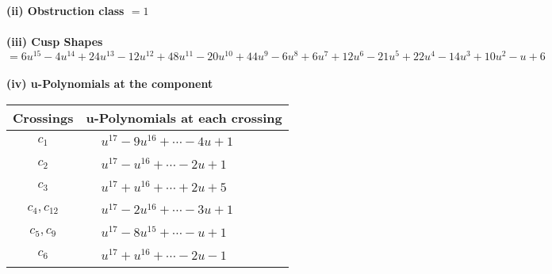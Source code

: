 \documentclass[1p]{elsarticle_modified}
\theoremstyle{definition}
\begin{document}
\flushleft \textbf{(ii) Obstruction class $= 1$}\\~\\
\flushleft \textbf{(iii) Cusp Shapes $= 6 u^{15}-4 u^{14}+24 u^{13}-12 u^{12}+48 u^{11}-20 u^{10}+44 u^9-6 u^8+6 u^7+12 u^6-21 u^5+22 u^4-14 u^3+10 u^2- u+6$}\\~\\
\newpage\renewcommand{\arraystretch}{1}
\flushleft \textbf{(iv) u-Polynomials at the component}\newline \\
\begin{tabular}{m{50pt}|m{274pt}}
Crossings & \hspace{64pt}u-Polynomials at each crossing \\
\hline $$\begin{aligned}c_{1}\end{aligned}$$&$\begin{aligned}
&u^{17}-9 u^{16}+\cdots-4 u+1
\end{aligned}$\\
\hline $$\begin{aligned}c_{2}\end{aligned}$$&$\begin{aligned}
&u^{17}- u^{16}+\cdots-2 u+1
\end{aligned}$\\
\hline $$\begin{aligned}c_{3}\end{aligned}$$&$\begin{aligned}
&u^{17}+u^{16}+\cdots+2 u+5
\end{aligned}$\\
\hline $$\begin{aligned}c_{4},c_{12}\end{aligned}$$&$\begin{aligned}
&u^{17}-2 u^{16}+\cdots-3 u+1
\end{aligned}$\\
\hline $$\begin{aligned}c_{5},c_{9}\end{aligned}$$&$\begin{aligned}
&u^{17}-8 u^{15}+\cdots- u+1
\end{aligned}$\\
\hline $$\begin{aligned}c_{6}\end{aligned}$$&$\begin{aligned}
&u^{17}+u^{16}+\cdots-2 u-1
\end{aligned}$\\

\end{tabular}
\end{document}
